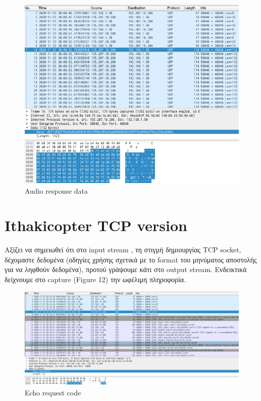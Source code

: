 \documentclass[12pt, a4paper]{article}
\begin{document}
\pagebreak
\begin{figure}[h!]
\centering
	\includegraphics[height=.4\textheight, width=\textwidth, keepaspectratio]{assets/wireshark/audio4.png}
	\caption{Audio response data} 
\end{figure}


\section{Ithakicopter TCP version}

Αξίζει να σημειωθεί ότι στο input stream , τη στιγμή δημιουργίας TCP socket, δέχομαστε δεδομένα (οδηγίες χρήσης σχετικά με το format του μηνύματος αποστολής για να ληφθούν δεδομένα), προτού γράψουμε κάτι στο output stream. Ενδεικτικά δείχνουμε στο capture (Figure 12) την ωφέλιμη πληροφορία. 

\begin{figure}[h!]
\centering
	\includegraphics[height=.4\textheight, width=\textwidth, keepaspectratio]{assets/wireshark/copter1.png}
	\caption{Echo request code} 
\end{figure}
\end{document}

